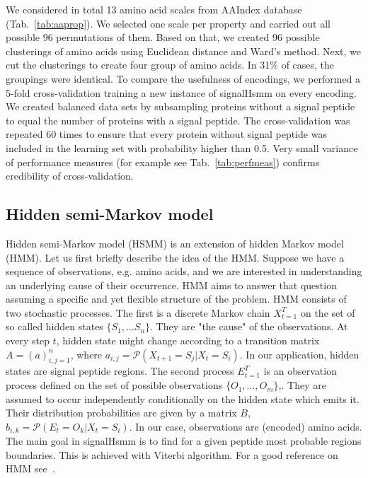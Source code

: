 \documentclass[fleqn,10pt,twoside]{gcb15submission}
\begin{document}
We considered in total 13 amino acid scales from AAIndex database~\citep{2008kawashimaaaindex} (Tab.~\ref{tab:aaprop}). We selected one scale per property and carried out all possible 96 permutations of them. Based on that, we created 96 possible clusterings of amino acids using Euclidean distance and Ward's method. Next, we cut the clusterings to create four group of amino acids. In 31\% of cases, the groupings were identical. To compare the usefulness of encodings, we performed a 5-fold cross-validation training a new instance of signalHsmm on every encoding. We created balanced data sets by subsampling proteins without a signal peptide to equal the number of proteins with a signal peptide. The cross-validation was repeated 60 times to ensure that every protein without signal peptide was included in the learning set with probability higher than 0.5. Very small variance of performance measures (for example see Tab.~\ref{tab:perfmeas})  confirms credibility of cross-validation.

\subsection*{Hidden semi-Markov model}
Hidden semi-Markov model (HSMM) is an extension of hidden Markov model (HMM). 
Let us first briefly describe the idea of the HMM. 
Suppose we have a sequence of observations, e.g. amino acids, and we are interested in understanding an underlying cause of their occurrence. 
HMM aims to answer that question assuming a specific and yet flexible structure of the problem.
HMM consists of two stochastic processes. The first is a discrete Markov chain $X_{t=1}^T$ on the set of so called hidden states $\{S_1, \dots S_n\}$.
They are "the cause" of the observations. At every step $t$, hidden state might change according to a transition matrix
$A= (a)_{i,j=1}^n$, where $a_{i,j} = \mathcal{P}(X_{t+1} = S_j | X_t = S_i)$. In our application, hidden states are signal peptide regions.
The second process $E_{t=1}^T$ is an observation process defined on the set of possible observations $\{O_1, \dots, O_m\}$,. They are assumed to occur independently conditionally on the hidden state which emits it. 
Their distribution probabilities are given by a matrix $B$, $b_{i,k} = \mathcal{P}(E_t = O_k | X_t = S_i)$.
In our case, observations are (encoded) amino acids.
The main goal in signalHsmm is to find for a given peptide most probable regions boundaries. This is achieved with Viterbi algorithm.
For a good reference on HMM see~\citep{1989rabinera}.
\end{document}
